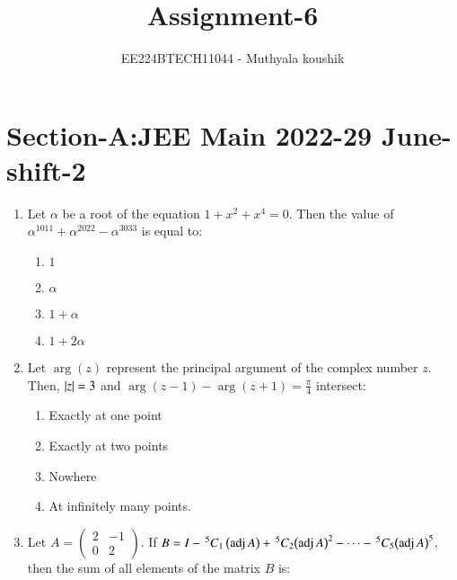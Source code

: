 \documentclass[journal,12pt,onecolumn]{IEEEtran}
\theoremstyle{remark}
\begin{document}

\vspace{3cm}

\title{Assignment-6}
\author{EE224BTECH11044 - Muthyala koushik
}
\maketitle
\bigskip

\renewcommand{\thefigure}{\theenumi}
\renewcommand{\thetable}{\theenumi}

\section{Section-A:JEE Main 2022-29 June-shift-2}
\begin{enumerate}[start=1]
	\item Let $\alpha$ be a root of the equation $1+x^2+x^4=0$. Then the value of ${\alpha}^{1011}+{\alpha}^{2022}-{\alpha}^{3033}$ is equal to:
		\begin{enumerate}
			\item $1$\\
			\item $\alpha$\\
			\item $1+\alpha$\\
			\item $1+2\alpha$\\
		\end{enumerate}
	\item Let $\arg(z)$ represent the principal argument of the complex number $z$. Then, $\left\vert z\right\vert=3$ and $\arg(z-1)-\arg(z+1)=\frac{\pi}{4}$ intersect:
		\begin{enumerate}
			\item Exactly at one point\\
			\item Exactly at two points\\
			\item Nowhere\\
			\item At infinitely many points.\\
		\end{enumerate}
	\item Let $A=\begin{pmatrix} 2 & -1 \\ 0 & 2 \end{pmatrix}$. If $B=I-\,^{5}C_{1}\left(\operatorname{adj}A\right)+\,^{5}C_{2}{\left(\operatorname{adj}A\right)}^2-\dots-\,^{5}C_{5}{\left(\operatorname{adj}A\right)}^5$, then the sum of all elements of the matrix $B$ is:

\end{enumerate}
\end{document}
